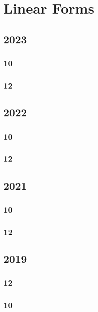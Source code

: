 \documentclass[11pt]{book}
\begin{document}
\chapter{Linear Forms}
\section{2023}
\subsection{10}

\subsection{12}                                                                                                  

\section{2022}
\subsection{10}

\subsection{12}

\section{2021}
\subsection{10}

\subsection{12}

\section{2019}
\subsection{12}


\subsection{10}

\end{document}
